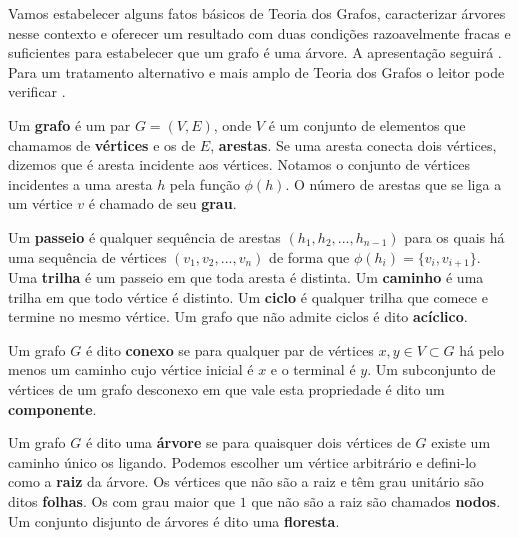 Vamos estabelecer alguns fatos básicos de Teoria dos Grafos, caracterizar árvores nesse contexto e oferecer um resultado com duas condições razoavelmente fracas e suficientes para estabelecer que um grafo é uma árvore. A apresentação seguirá . Para um tratamento alternativo e mais amplo de Teoria dos Grafos o leitor pode verificar .

\begin{defi}[Grafos]
Um \textbf{grafo} é um par $G = (V, E)$, onde $V$ é um conjunto de elementos que chamamos de \textbf{vértices} e os de $E$, \textbf{arestas}. Se uma aresta conecta dois vértices, dizemos que é aresta incidente aos vértices. Notamos o conjunto de vértices incidentes a uma aresta $h$ pela função $\phi(h)$. O número de arestas que se liga a um vértice $v$ é chamado de seu \textbf{grau}.
\end{defi}

\begin{defi}
Um \textbf{passeio} é qualquer sequência de arestas $(h_1, h_2, ..., h_{n-1})$ para os quais há uma sequência de vértices $(v_1, v_2, ..., v_n)$ de forma que $\phi(h_i) = \{v_i, v_{i+1}\}$. Uma \textbf{trilha} é um passeio em que toda aresta é distinta. Um \textbf{caminho} é uma trilha em que todo vértice é distinto. Um \textbf{ciclo} é qualquer trilha que comece e termine no mesmo vértice. Um grafo que não admite ciclos é dito \textbf{acíclico}.
\end{defi}

\begin{defi}[Conexidade]
Um grafo $G$ é dito \textbf{conexo} se para qualquer par de vértices $x, y \in V \subset G$ há pelo menos um caminho cujo vértice inicial é $x$ e o terminal é $y$. Um subconjunto de vértices de um grafo desconexo em que vale esta propriedade é dito um \textbf{componente}.
\end{defi}


\begin{defi}[Árvores]
Um grafo $G$ é dito uma \textbf{árvore} se para quaisquer dois vértices de $G$ existe um caminho único os ligando. Podemos escolher um vértice arbitrário e defini-lo como a \textbf{raiz} da árvore. Os vértices que não são a raiz e têm grau unitário são ditos \textbf{folhas}. Os com grau maior que $1$ que não são a raiz são chamados \textbf{nodos}. Um conjunto disjunto de árvores é dito uma \textbf{floresta}.
\end{defi}


\begin{figure}[H]
    \centering
       \label{fig:grafos}
\end{figure}

